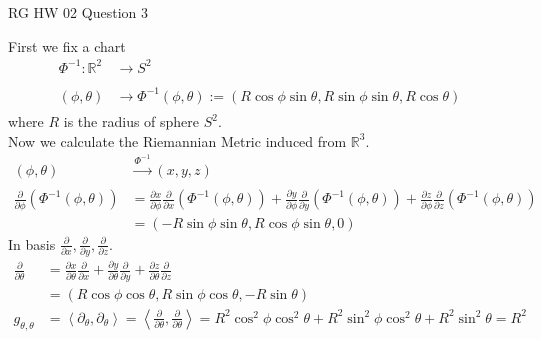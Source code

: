 \documentclass{article}
\begin{document}
\maketitle
RG HW 02 Question 3
\pagebreak

\begin{homeworkProblem}
    First we fix a chart 
    \begin{align}
        \Phi^{-1} : \mathbb{R}^2 &\xrightarrow[]{} S^2 \\
        (\phi, \theta) &\xrightarrow[]{} \Phi^{-1}(\phi, \theta) := (R \cos \phi \sin \theta, R \sin \phi \sin \theta, R \cos \theta)
    \end{align}
    where $R$ is the radius of sphere $S^2$.\\
    Now we calculate the Riemannian Metric induced from $\mathbb{R}^3$.
    \begin{align}
        (\phi, \theta) &\xrightarrow[]{\Phi^{-1}} (x,y,z)\\
        \frac{ \partial }{ \partial \phi } \left( \Phi^{-1} \left( \phi, \theta \right)\right) 
        &= \frac{ \partial x }{ \partial \phi } \frac{ \partial  }{ \partial x } \left( \Phi^{-1} \left( \phi, \theta \right)\right) 
        + \frac{ \partial y }{ \partial \phi } \frac{ \partial  }{ \partial y } \left( \Phi^{-1} \left( \phi, \theta \right)\right) 
        + \frac{ \partial z }{ \partial \phi } \frac{ \partial }{ \partial z } \left( \Phi^{-1} \left( \phi, \theta \right)\right) \\
        &= (-R \sin \phi \sin \theta, R \cos \phi \sin \theta, 0)
    \end{align}
    In basis $\frac{ \partial }{ \partial x }, \frac{ \partial }{ \partial y }, \frac{ \partial }{ \partial z }$.\\
    \begin{align}
        \frac{ \partial }{ \partial \theta } &= \frac{ \partial x }{ \partial \theta } \frac{ \partial }{ \partial x } 
        + \frac{ \partial y }{ \partial \theta } \frac{ \partial }{ \partial y }
        + \frac{ \partial z }{ \partial \theta } \frac{ \partial  }{ \partial z }\\
        &= (R \cos \phi \cos \theta, R \sin \phi \cos \theta, -R \sin \theta)\\
        g_{\theta, \theta} &= \left\langle \partial_{\theta}, \partial_{\theta} \right\rangle 
        = \left\langle \frac{ \partial  }{ \partial \theta }, \frac{ \partial  }{ \partial \theta }\right\rangle
        = R^2 \cos^2 \phi \cos^2 \theta + R^2 \sin^2 \phi \cos^2 \theta + R^2 \sin^2 \theta = R^2

\end{align}
\end{homeworkProblem}
\end{document}
